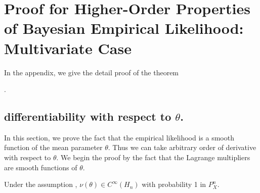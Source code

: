 \chapter{Proof for Higher-Order Properties of Bayesian Empirical Likelihood:
Multivariate Case}

In the appendix, we give the detail proof of the theorem %
\begin{comment}
asymptotic expansion theorem 
\end{comment}
. 


\section{differentiability with respect to $\theta$. }

In this section, we prove the fact that the empirical likelihood is
a smooth function of the mean parameter $\theta$. Thus we can take
arbitrary order of derivative with respect to $\theta$. We begin
the proof by the fact that the Lagrange multipliers are smooth functions
of $\theta$. 
\begin{lem}
\label{lem:mul-el-smooth-lagrange-multp}Under the assumption ,
$\nu\left(\theta\right)\in C^{\infty}\left(H_{n}\right)$ with probability
1 in $P_{X}^{n}$. \end{lem}

